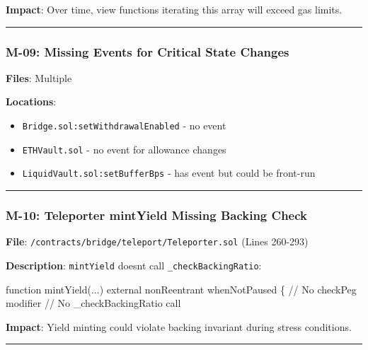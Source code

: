 \documentclass[
]{article}
\newenvironment{Shaded}{}{}
\newcommand{\NormalTok}[1]{#1}
\providecommand{\tightlist}{%
  \setlength{\itemsep}{0pt}\setlength{\parskip}{0pt}}
\begin{document}
\textbf{Impact}: Over time, view functions iterating this array will
exceed gas limits.

\begin{center}\rule{0.5\linewidth}{0.5pt}\end{center}

\subsubsection{M-09: Missing Events for Critical State
Changes}\label{m-09-missing-events-for-critical-state-changes}

\textbf{Files}: Multiple

\textbf{Locations}:

\begin{itemize}
\tightlist
\item
  \texttt{Bridge.sol:setWithdrawalEnabled} - no event
\item
  \texttt{ETHVault.sol} - no event for allowance changes
\item
  \texttt{LiquidVault.sol:setBufferBps} - has event but could be
  front-run
\end{itemize}

\begin{center}\rule{0.5\linewidth}{0.5pt}\end{center}

\subsubsection{M-10: Teleporter mintYield Missing Backing
Check}\label{m-10-teleporter-mintyield-missing-backing-check}

\textbf{File}: \texttt{/contracts/bridge/teleport/Teleporter.sol} (Lines
260-293)

\textbf{Description}: \texttt{mintYield} doesn\textquotesingle t call
\texttt{\_checkBackingRatio}:

\begin{Shaded}
\begin{Highlighting}[]
\NormalTok{function mintYield(...) external nonReentrant whenNotPaused \{}
\NormalTok{    // No checkPeg modifier}
\NormalTok{    // No \_checkBackingRatio call}
\end{Highlighting}
\end{Shaded}

\textbf{Impact}: Yield minting could violate backing invariant during
stress conditions.

\begin{center}\rule{0.5\linewidth}{0.5pt}\end{center}
\end{document}
